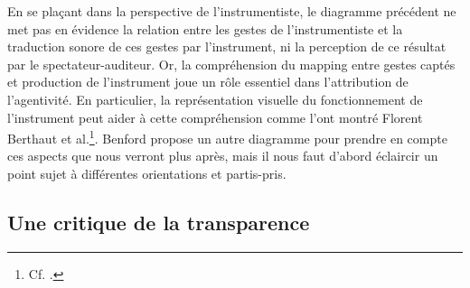 \indent En se plaçant dans la perspective de l'instrumentiste, le diagramme précédent ne met pas en évidence la relation entre les gestes de l'instrumentiste et la traduction sonore de ces gestes par l'instrument, ni la perception de ce résultat par le spectateur-auditeur. Or, la compréhension du mapping entre gestes captés et production de l'instrument joue un rôle essentiel dans l'attribution de l'agentivité. En particulier, la représentation visuelle du fonctionnement de l'instrument peut aider à cette compréhension comme l'ont montré Florent Berthaut et al.\footnote{Cf. \cite{berthaut_rouages:_2013, berthaut_liveness_2015}.}. Benford propose un autre diagramme pour prendre en compte ces aspects que nous verront plus après, mais il nous faut d'abord éclaircir un point sujet à différentes orientations et partis-pris. 

\subsection{Une critique de la transparence}
\label{sec:gesture:critique_transparency}

